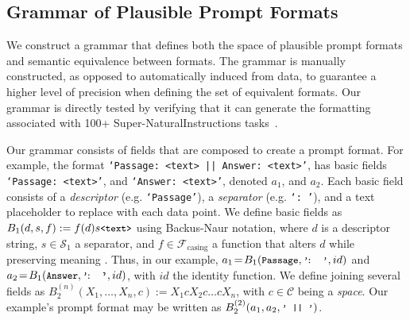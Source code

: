 \documentclass{article} %
\newcommand{\prompt}[1]{{\small{\texttt{#1}}}}
\begin{document}
\subsection{Grammar of Plausible Prompt Formats}\label{sec:grammar}
We construct a grammar that defines both the space of plausible prompt formats and semantic equivalence between formats. 
The grammar is manually constructed, as opposed to automatically induced from data, to guarantee a higher level of precision when defining the set of equivalent formats. 
Our grammar is directly %
tested by verifying that it can generate the formatting associated with 100+ Super-NaturalInstructions tasks~\citep{wang2022super}. %

Our grammar consists of fields that are composed to create a prompt format. 
For example, the format \prompt{`Passage: <text> || Answer: <text>'}, has basic fields \prompt{`Passage: <text>'}, and \prompt{`Answer: <text>'}, denoted $a_1$, and $a_2$. 
Each basic field consists of a \textit{descriptor} (e.g. \prompt{`{Passage}'}), a \textit{separator} (e.g. \prompt{`: '}), and a text placeholder to replace with each data point. 
We define basic fields as $B_1(d, s, f) := f(d) s \text{\prompt{<text>}}$ using Backus-Naur notation, where $d$ is a descriptor string, $s\!\in\!\mathcal{S}_1$ a separator, and $f\!\in\!\mathcal{F}_{\text{casing}}$ a function that alters $d$ while preserving meaning%
. Thus, in our example, $a_1\!=\!B_1(\text{\prompt{Passage}}, \text{\prompt{'\!:\ \ '}}, id)$ and  %
$a_2\!=\!B_1(\text{\prompt{Answer}}, \text{\prompt{'\!:\ \ '}}, id)$, with $id$ the identity function. We define joining several fields as $B_2^{(n)}(X_1\!,\ldots\!,X_n,\!c) := X_1 c X_2 c \ldots c X_n$, with $c\!\in\!\mathcal{C}$ being a \textit{space}. Our example's prompt format may be written as $B_2^{(2)}(a_1, a_2, \text{\prompt{'\ ||\ '}})$.
\end{document}
